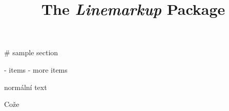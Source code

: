 \documentclass{article}
\begin{document}
\title{The \textit{Linemarkup} Package}

# sample section

- items 
- more items

\noindent normální text

Cože
\end{document}
